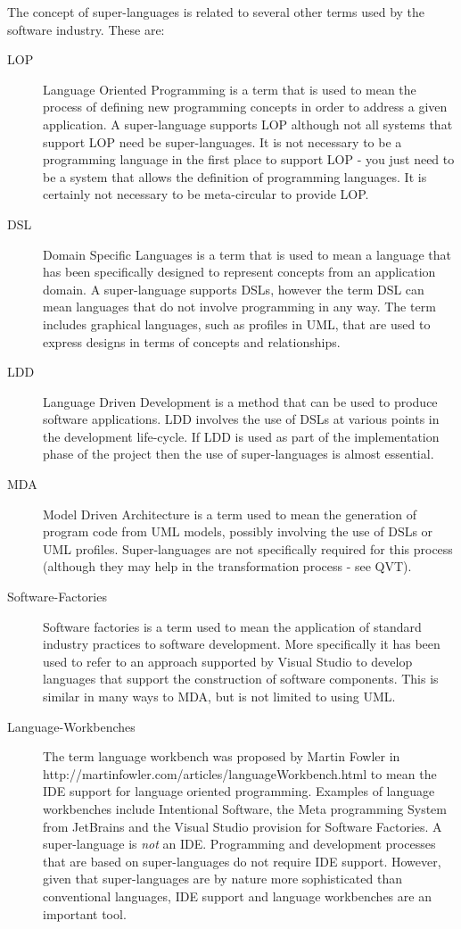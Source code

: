 The concept of super-languages is related to several other terms used
by the software industry. These are:

\begin{description}
\item [{LOP}] Language Oriented Programming is a term that is used to mean
the process of defining new programming concepts in order to address
a given application. A super-language supports LOP although not all
systems that support LOP need be super-languages. It is not necessary
to be a programming language in the first place to support LOP - you
just need to be a system that allows the definition of programming
languages. It is certainly not necessary to be meta-circular to provide
LOP.
\item [{DSL}] Domain Specific Languages is a term that is used to mean
a language that has been specifically designed to represent concepts
from an application domain. A super-language supports DSLs, however
the term DSL can mean languages that do not involve programming in
any way. The term includes graphical languages, such as profiles in
UML, that are used to express designs in terms of concepts and relationships.
\item [{LDD}] Language Driven Development is a method that can be used
to produce software applications. LDD involves the use of DSLs at
various points in the development life-cycle. If LDD is used as part
of the implementation phase of the project then the use of super-languages
is almost essential.
\item [{MDA}] Model Driven Architecture is a term used to mean the generation
of program code from UML models, possibly involving the use of DSLs
or UML profiles. Super-languages are not specifically required for
this process (although they may help in the transformation process
- see QVT).
\item [{Software-Factories}] Software factories is a term used to mean
the application of standard industry practices to software development.
More specifically it has been used to refer to an approach supported
by Visual Studio to develop languages that support the construction
of software components. This is similar in many ways to MDA, but is
not limited to using UML.
\item [{Language-Workbenches}] The term language workbench was proposed
by Martin Fowler in http://martinfowler.com/articles/languageWorkbench.html
to mean the IDE support for language oriented programming. Examples
of language workbenches include Intentional Software, the Meta programming
System from JetBrains and the Visual Studio provision for Software
Factories. A super-language is \emph{not} an IDE. Programming and
development processes that are based on super-languages do not require
IDE support. However, given that super-languages are by nature more
sophisticated than conventional languages, IDE support and language
workbenches are an important tool.
\end{description}

